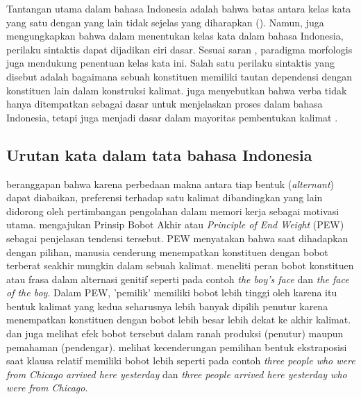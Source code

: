 Tantangan utama dalam bahasa Indonesia adalah bahwa batas antara kelas kata yang satu dengan yang lain tidak sejelas yang diharapkan (\citealp{kridalaksana2002struktur, achmad2013linguistik}). Namun, \cite{kridalaksana2002struktur} juga mengungkapkan bahwa dalam menentukan kelas kata dalam bahasa Indonesia, perilaku sintaktis dapat dijadikan ciri dasar. Sesuai saran \cite{robins1985linguistics}, paradigma morfologis juga mendukung penentuan kelas kata ini. Salah satu perilaku sintaktis yang disebut \cite{kridalaksana2002struktur} adalah bagaimana sebuah konstituen memiliki tautan dependensi dengan konstituen lain dalam konstruksi kalimat. \cite{demena2008bahasa} juga menyebutkan bahwa verba tidak hanya ditempatkan sebagai dasar untuk menjelaskan proses dalam bahasa Indonesia, tetapi juga menjadi dasar dalam mayoritas pembentukan kalimat \citep{kridalaksana1999deskriptif}.

\subsection{Urutan kata dalam tata bahasa Indonesia}
\cite{wasow2002postverbal} beranggapan bahwa karena perbedaan makna antara tiap bentuk (\textit{alternant}) dapat diabaikan, preferensi terhadap satu kalimat dibandingkan yang lain didorong oleh pertimbangan pengolahan dalam memori kerja sebagai motivasi utama. \cite{wasow2002postverbal} mengajukan Prinsip Bobot Akhir atau \textit{Principle of End Weight} (PEW) sebagai penjelasan tendensi tersebut. PEW menyatakan bahwa saat dihadapkan dengan pilihan, manusia cenderung menempatkan konstituen dengan bobot terberat seakhir mungkin dalam sebuah kalimat. \cite{rosenbach2005animacy} meneliti peran bobot konstituen atau frasa dalam alternasi genitif seperti pada contoh \textit{the boy's face} dan \textit{the face of the boy}. Dalam PEW, 'pemilik' memiliki bobot lebih tinggi oleh karena itu bentuk kalimat yang kedua seharusnya lebih banyak dipilih penutur karena menempatkan konstituen dengan bobot lebih besar lebih dekat ke akhir kalimat. \cite{francis2010grammatical} dan \cite{rosenbach2005animacy} juga melihat efek bobot tersebut dalam ranah produksi (penutur) maupun pemahaman (pendengar). \cite{francis2010grammatical} melihat kecenderungan pemilihan bentuk ekstraposisi saat klausa relatif memiliki bobot lebih seperti pada contoh \textit{three people who were from Chicago arrived here yesterday} dan \textit{three people arrived here yesterday who were from Chicago}.

